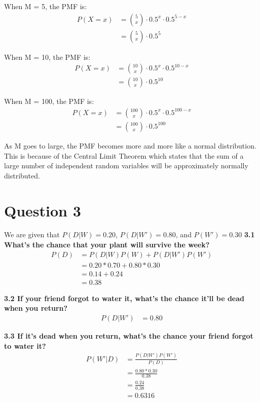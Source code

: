 \documentclass{article}
\begin{document}
When M = 5, the PMF is:
\begin{align*}
    P(X = x) &= \binom{5}{x} \cdot 0.5^x \cdot 0.5^{5-x} \\
    &= \binom{5}{x} \cdot 0.5^5
\end{align*}
    
When M = 10, the PMF is:
\begin{align*}
    P(X = x) &= \binom{10}{x} \cdot 0.5^x \cdot 0.5^{10-x} \\
    &= \binom{10}{x} \cdot 0.5^{10}
\end{align*}

When M = 100, the PMF is:
\begin{align*}
    P(X = x) &= \binom{100}{x} \cdot 0.5^x \cdot 0.5^{100-x} \\
    &= \binom{100}{x} \cdot 0.5^{100}
\end{align*}

\noindent As M goes to large, the PMF becomes more and more like a normal distribution. This is because of the Central Limit Theorem which states that the sum of a large number of independent random variables will be approximately normally distributed.


\section*{Question 3}

We are given that $P(D|W) = 0.20$, $P(D|W') = 0.80$, and $P(W') = 0.30$
\bigbreak
\noindent \textbf{3.1 What's the chance that your plant will survive the week?}
\begin{align*}
    P(D) &= P(D|W)P(W) + P(D|W')P(W') \\
    &= 0.20*0.70 + 0.80*0.30 \\
    &= 0.14 + 0.24 \\
    &= 0.38
\end{align*}

\noindent \textbf{3.2 If your friend forgot to water it, what's the chance it'll be dead when you return?}
\begin{align*}
    P(D|W') &= 0.80
\end{align*}

\noindent \textbf{3.3 If it's dead when you return, what's the chance your friend forgot to water it?}
\begin{align*}
    P(W'|D) &= \frac{P(D|W')P(W')}{P(D)} \\
    &= \frac{0.80*0.30}{0.38} \\
    &= \frac{0.24}{0.38} \\
    &= 0.6316
\end{align*}
\end{document}
